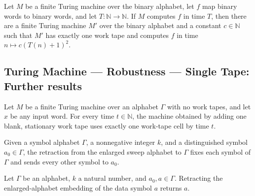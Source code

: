 \begin{theorem}
\label{Turing.FinTM.one_work_tape_binary}
\leanok
{}
Let $M$ be a finite Turing machine over the binary alphabet, let $f$ map binary words to
binary words, and let $T\colon\mathbb N\to\mathbb N$. If $M$ computes $f$ in time $T$,
then there are a finite Turing machine $M'$ over the binary alphabet and a constant
$c\in\mathbb N$ such that $M'$ has exactly one work tape and computes $f$ in time
$n\mapsto c(T(n)+1)^2$.
\end{theorem}

\subsection*{Turing Machine --- Robustness --- Single Tape: Further results}

\begin{lemma}
\label{Turing.FinTM.dg_unused_space}
\leanok
{}
Let $M$ be a finite Turing machine over an alphabet $\Gamma$ with no work tapes, and let
$x$ be any input word. For every time $t\in\mathbb N$, the machine obtained by adding
one blank, stationary work tape uses exactly one work-tape cell by time $t$.
\end{lemma}

\begin{definition}
\label{Turing.FinTM.dgRetract}
\leanok
{}
Given a symbol alphabet $\Gamma$, a nonnegative integer $k$, and a distinguished symbol
$a_0 \in \Gamma$, the retraction from the enlarged sweep alphabet to $\Gamma$ fixes each
symbol of $\Gamma$ and sends every other symbol to $a_0$.
\end{definition}

\begin{lemma}
\label{Turing.FinTM.dgRetract_embed}
\leanok
{}
Let $\Gamma$ be an alphabet, $k$ a natural number, and $a_0,a\in\Gamma$. Retracting the
enlarged-alphabet embedding of the data symbol $a$ returns $a$.
\end{lemma}

